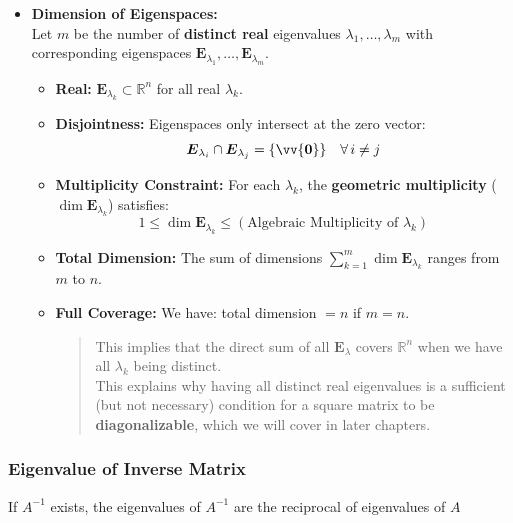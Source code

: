\documentclass[11pt]{article}
\DeclareRobustCommand{\myvec}[1]{\vv{\mathbf{#1}}}
\newcommand{\mysubvecsp}[1]{\bm{{#1}}}
\newcommand{\mymat}[1]{#1}
\begin{document}
\begin{itemize}
        \item \textbf{Dimension of Eigenspaces:} \vspace{1ex} \\
            Let $m$ be the number of \textbf{distinct real} eigenvalues $\lambda_1, \dots, \lambda_m$ with corresponding eigenspaces $\mysubvecsp{E}_{\lambda_1}, \dots, \mysubvecsp{E}_{\lambda_m}$.
            \begin{itemize}
                \item \textbf{Real:} $\mysubvecsp{E}_{\lambda_k} \subset \mathbb{R}^n$ for all real $\lambda_k$.
                \item \textbf{Disjointness:} Eigenspaces only intersect at the zero vector:
                \begin{equation}
                    \mysubvecsp{E}_{\lambda_i} \cap \mysubvecsp{E}_{\lambda_j} = \{\myvec{0}\} \quad \forall\,i \ne j
                \end{equation}
                \item \textbf{Multiplicity Constraint:} For each $\lambda_k$, the \textbf{geometric multiplicity} ($\dim \mysubvecsp{E}_{\lambda_k}$) satisfies:
                \begin{equation}
                    1 \le \dim \mysubvecsp{E}_{\lambda_k} \le (\text{Algebraic Multiplicity of } \lambda_k)
                \end{equation}
                \item \textbf{Total Dimension:} The sum of dimensions $\sum_{k=1}^m \dim \mysubvecsp{E}_{\lambda_k}$ ranges from $m$ to $n$.
                \item \textbf{Full Coverage:} We have: total dimension $ = n$ if $m = n$. \\ 
                    \begin{quote}
                        This implies that the direct sum of all $\mysubvecsp{E}_{\lambda}$ covers $\mathbb{R}^n$ when we have all $\lambda_k$ being distinct. \\
                        This explains why having all distinct real eigenvalues is a sufficient (but not necessary) condition for a square matrix to be \textbf{diagonalizable}, which we will cover in later chapters.
                    \end{quote}
            \end{itemize}
    \end{itemize}
    
    \newpage
    \subsubsection{Eigenvalue of Inverse Matrix}
    If $\mymat{A}^{-1}$ exists, the eigenvalues of $\mymat{A}^{-1}$ are the reciprocal of eigenvalues of $\mymat{A}$\\
    
\end{document}
